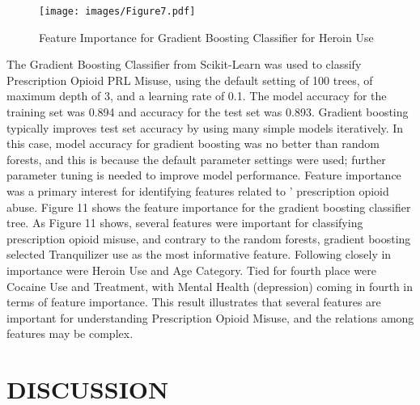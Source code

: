 \documentclass[sigconf]{acmart}
\begin{document}
\begin{figure}[!ht]
  \centering\texttt{[image: images/Figure7.pdf]}
  \caption{Feature Importance for Gradient Boosting Classifier for Heroin Use}
  \label{f:Figure7}
\end{figure}

The Gradient Boosting Classifier from Scikit-Learn was used to classify 
Prescription Opioid PRL Misuse, using the default setting of 100 trees, of 
maximum depth of 3, and a learning rate of 0.1. The model accuracy for the
training set was 0.894 and accuracy for the test set was 0.893. Gradient 
boosting typically improves test set accuracy by using many simple models 
iteratively. In this case, model accuracy for gradient boosting was no better 
than random forests, and this is because the default parameter settings were
used; further parameter tuning is needed to improve model performance. Feature 
importance was a primary interest for identifying features related to '
prescription opioid abuse. Figure 11 shows the feature importance for the 
gradient boosting classifier tree. As Figure 11 shows, several features were 
important for classifying prescription opioid misuse, and contrary to the 
random forests, gradient boosting selected Tranquilizer use as the most 
informative feature. Following closely in importance were Heroin Use and Age 
Category. Tied for fourth place were Cocaine Use and Treatment, with Mental 
Health (depression) coming in fourth in terms of feature importance. This 
result illustrates that several features are important for understanding 
Prescription Opioid Misuse, and the relations among features may be complex.




\section{DISCUSSION}
\end{document}
